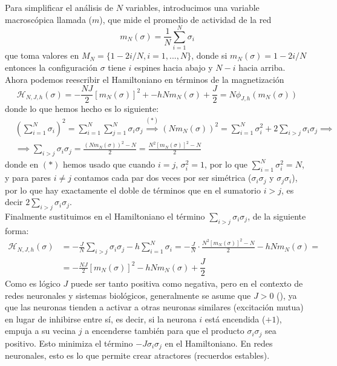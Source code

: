 \noindent
Para simplificar el análisis de $N$ variables, introducimos una variable macroscópica llamada  ($m$), que mide el promedio de actividad de la red
\begin{equation*}
    m_N(\sigma) = \frac{1}{N} \sum_{i=1}^{N} \sigma_i
\end{equation*}
que toma valores en $M_N = \{1 - 2i/N, i = 1, ..., N \}$, donde si $m_N(\sigma) = 1 - 2i/N$ entonces la configuración $\sigma$ tiene $i$ espines hacia abajo y $N - i$ hacia arriba. Ahora podemos reescribir el Hamiltoniano en términos de la magnetización
\begin{equation*}
    \mathcal{H}_{N,J,h}(\sigma) = - \frac{NJ}{2} [m_N(\sigma)]^2 +-hN m_N(\sigma) +\dfrac{J}{2}=N\phi_{J,h}(m_N(\sigma))
\end{equation*}
donde lo que hemos hecho es lo siguiente:
\begin{align*}
    &\left( \sum_{i=1}^N \sigma_i \right)^2 = \sum_{i=1}^N \sum_{j=1}^N \sigma_i \sigma_j \overset{(*)}{\implies} (Nm_N(\sigma))^2 = \sum_{i=1}^N \sigma_i^2 + 2 \sum_{i>j} \sigma_i \sigma_j \implies \\
    &\implies \sum_{i>j} \sigma_i \sigma_j = \frac{(Nm_N(\sigma))^2 - N}{2} = \frac{N^2 [m_N(\sigma)]^2 - N}{2}
\end{align*}
donde en $(*)$ hemos usado que cuando $i=j$, $\sigma_i^2 = 1$, por lo que $\sum_{i=1}^N \sigma_i^2 = N$, y para pares $i\neq j$ contamos cada par dos veces por ser simétrica ($\sigma_i \sigma_j$ y $\sigma_j \sigma_i$), por lo que hay exactamente el doble de términos que en el sumatorio $i > j$, es decir $2 \sum_{i>j} \sigma_i \sigma_j$. \\
\noindent       
Finalmente sustituimos en el Hamiltoniano el término $\sum_{i>j} \sigma_i \sigma_j $, de la siguiente forma:
\begin{align*}
    \mathcal{H}_{N,J,h}(\sigma) &= - \frac{J}{N} \sum_{i > j} \sigma_i \sigma_j - h \sum_{i=1}^{N} \sigma_i = - \frac{J}{N} \cdot \frac{N^2 [m_N(\sigma)]^2 - N}{2} - hN m_N(\sigma) = \\
    &= - \frac{NJ}{2} [m_N(\sigma)]^2 - hN m_N(\sigma) +\dfrac{J}{2}
\end{align*}
Como es lógico $J$ puede ser tanto positiva como negativa, pero en el contexto de redes neuronales y sistemas biológicos, generalmente se asume que $J > 0$ (), ya que las neuronas tienden a activar a otras neuronas similares (excitación mutua) en lugar de inhibirse entre sí, es decir, si la neurona $i$ está encendida ($+1$), empuja a su vecina $j$ a encenderse también para que el producto $\sigma_i \sigma_j$ sea positivo. Esto minimiza el término $-J \sigma_i \sigma_j$ en el Hamiltoniano. En redes neuronales, esto es lo que permite crear atractores (recuerdos estables). \\

